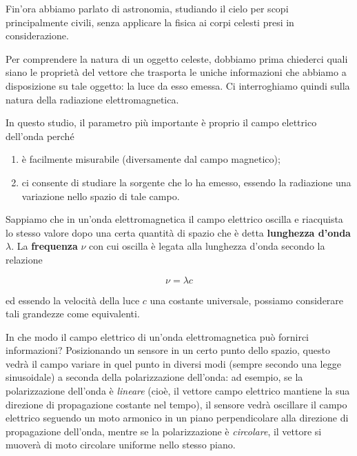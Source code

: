 Fin'ora abbiamo parlato di astronomia, studiando il cielo per scopi principalmente civili, senza applicare la fisica ai corpi celesti presi in considerazione.

Per comprendere la natura di un oggetto celeste, dobbiamo prima chiederci quali siano le proprietà del vettore che trasporta le uniche informazioni che abbiamo a disposizione su tale oggetto: la luce da esso emessa. Ci interroghiamo quindi sulla natura della radiazione elettromagnetica.

In questo studio, il parametro più importante è proprio il campo elettrico dell'onda perché

\begin{enumerate}
    \item è facilmente misurabile (diversamente dal campo magnetico);
    \item ci consente di studiare la sorgente che lo ha emesso, essendo la radiazione una variazione nello spazio di tale campo.
\end{enumerate} 

Sappiamo che in un'onda elettromagnetica il campo elettrico oscilla e riacquista lo stesso valore dopo una certa quantità di spazio che è detta \textbf{lunghezza d'onda} $\lambda$. La \textbf{frequenza} $\nu$ con cui oscilla è legata alla lunghezza d'onda secondo la relazione

$$\nu={\lambda}{c}$$

ed essendo la velocità della luce $c$ una costante universale, possiamo considerare tali grandezze come equivalenti.

\vspace{0.2cm}In che modo il campo elettrico di un'onda elettromagnetica può fornirci informazioni? Posizionando un sensore in un certo punto dello spazio, questo vedrà il campo variare in quel punto in diversi modi (sempre secondo una legge sinusoidale) a seconda della polarizzazione dell'onda: ad esempio, se la polarizzazione dell'onda è \textit{lineare} (cioè, il vettore campo elettrico mantiene la sua direzione di propagazione costante nel tempo), il sensore vedrà oscillare il campo elettrico seguendo un moto armonico in un piano perpendicolare alla direzione di propagazione dell'onda, mentre se la polarizzazione è \textit{circolare}, il vettore si muoverà di moto circolare uniforme nello stesso piano.

